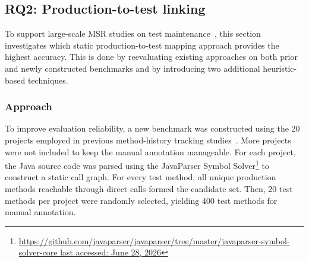 \subsection{RQ2: Production-to-test linking}
To support large-scale MSR studies on test maintenance~\cite{tufano2022methods2test}, this section investigates which static production-to-test mapping approach provides the highest accuracy. This is done by reevaluating existing approaches on both prior and newly constructed benchmarks and by introducing two additional heuristic-based techniques.

\subsubsection{Approach}

To improve evaluation reliability, a new benchmark was constructed using the 20 projects employed in previous method-history tracking studies~\cite{grund:2021,jodavi_accurate_2022,islam_historyfinder_2025}. More projects were not included to keep the manual annotation manageable. For each project, the Java source code was parsed using the JavaParser Symbol Solver\footnote{\href{https://github.com/javaparser/javaparser/tree/master/javaparser-symbol-solver-core}{https://github.com/javaparser/javaparser/tree/master/javaparser-symbol-solver-core last accessed: June 28, 2026}} to construct a static call graph. For every test method, all unique production methods reachable through direct calls formed the candidate set. Then, 20 test methods per project were randomly selected, yielding 400 test methods for manual annotation.


